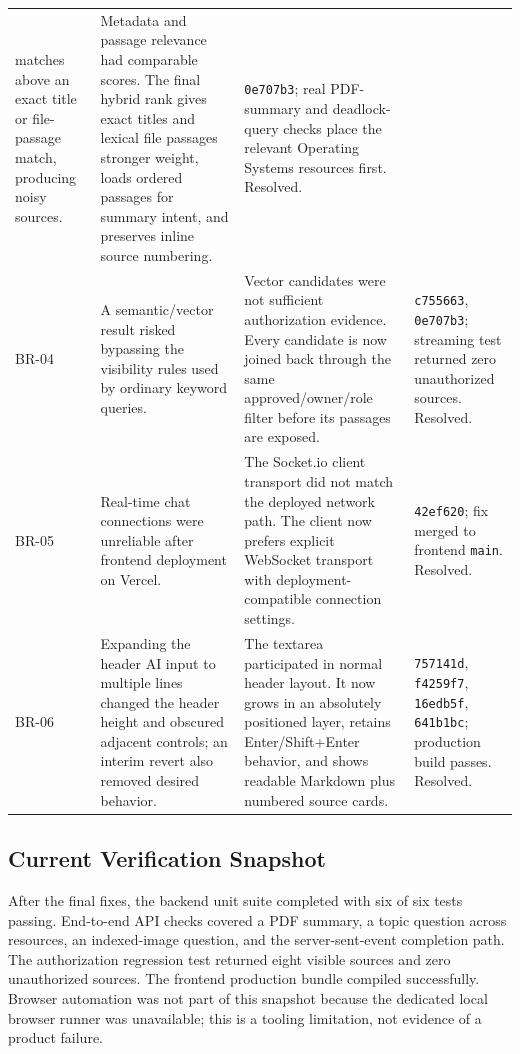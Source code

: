 \documentclass[12pt,a4paper]{report}
\begin{document}
\begin{longtable}{@{}>{\raggedright\arraybackslash}p{1.15cm}
  >{\raggedright\arraybackslash}p{4.15cm}
  >{\raggedright\arraybackslash}p{5.15cm}
  >{\raggedright\arraybackslash}p{3.1cm}@{}}
matches above an exact title or file-passage match, producing noisy
sources. &
Metadata and passage relevance had comparable scores. The final
hybrid rank gives exact titles and lexical file passages stronger
weight, loads ordered passages for summary intent, and preserves
inline source numbering. & \texttt{0e707b3}; real PDF-summary and
deadlock-query checks place the relevant Operating Systems resources
first. Resolved. \\
\addlinespace
BR-04 & A semantic/vector result risked bypassing the visibility rules
used by ordinary keyword queries. &
Vector candidates were not sufficient authorization evidence. Every
candidate is now joined back through the same approved/owner/role
filter before its passages are exposed. & \texttt{c755663},
\texttt{0e707b3}; streaming test returned zero unauthorized sources.
Resolved. \\
\addlinespace
BR-05 & Real-time chat connections were unreliable after frontend
deployment on Vercel. &
The Socket.io client transport did not match the deployed network
path. The client now prefers explicit WebSocket transport with
deployment-compatible connection settings. & \texttt{42ef620}; fix
merged to frontend \texttt{main}. Resolved. \\
\addlinespace
BR-06 & Expanding the header AI input to multiple lines changed the
header height and obscured adjacent controls; an interim revert also
removed desired behavior. &
The textarea participated in normal header layout. It now grows in an
absolutely positioned layer, retains Enter/Shift+Enter behavior, and
shows readable Markdown plus numbered source cards. &
\texttt{757141d}, \texttt{f4259f7}, \texttt{16edb5f},
\texttt{641b1bc}; production build passes. Resolved. \\
\bottomrule
\end{longtable}

\subsection{Current Verification Snapshot}
After the final fixes, the backend unit suite completed with six of
six tests passing. End-to-end API checks covered a PDF summary, a
topic question across resources, an indexed-image question, and the
server-sent-event completion path. The authorization regression test
returned eight visible sources and zero unauthorized sources. The
frontend production bundle compiled successfully. Browser automation
was not part of this snapshot because the dedicated local browser
runner was unavailable; this is a tooling limitation, not evidence of
a product failure.
\end{document}
